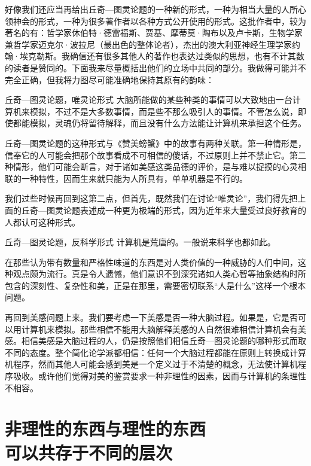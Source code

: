 好像我们还应当再给出丘奇—图灵论题的一种新的形式，一种为相当大量的人所心领神会的形式，一种为很多著作者以各种方式公开使用的形式。这批作者中，较为著名的有：哲学家休伯特·德雷福斯、贾基、摩蒂莫·陶布以及卢卡斯，生物学家兼哲学家迈克尔·波拉尼（最出色的整体论者），杰出的澳大利亚神经生理学家约翰·埃克勒斯。我确信还有很多其他人的著作也表达过类似的思想，也有不计其数的读者是赞同的。下面我来尽量概括出他们的立场中共同的部分。我做得可能并不完全正确，但我将力图尽可能准确地保持其原有的韵味：

\begin{thm}[2\ccwd]{丘奇—图灵论题，唯灵论形式}
大脑所能做的某些种类的事情可以大致地由一台计算机来模拟，不过不是大多数事情，而是些不那么吸引人的事情。不管怎么说，即使都能模拟，灵魂仍将留待解释，而且没有什么方法能让计算机来承担这个任务。
\end{thm}

丘奇—图灵论题的这种形式与《赞美螃蟹》中的故事有两种关联。第一种情形是，信奉它的人可能会把那个故事看成不可相信的傻话，不过原则上并不禁止它。第二种情形，他们可能会断言，对于诸如美感这类品德的评价，是与难以捉摸的心灵相联的一种特性，因而生来就只能为人所具有，单单机器是不行的。

我们过些时候再回到这第二点，但首先，既然我们在讨论“唯灵论”，我们得先把上面的丘奇—图灵论题表述成一种更为极端的形式，因为近年来大量受过良好教育的人都认可这种形式。

\begin{thm}[2\ccwd]{丘奇—图灵论题，反科学形式}
计算机是荒唐的。一般说来科学也都如此。
\end{thm}

在那些认为带有数量和严格性味道的东西是对人类价值的一种威胁的人们中间，这种观点颇为流行。真是令人遗憾，他们意识不到深究诸如人类心智等抽象结构时所包含的深刻性、复杂性和美，正是在那里，需要密切联系“人是什么”这样一个根本问题。

再回到美感问题上来。我们要考虑一下美感是否一种大脑过程。如果是，它是否可以用计算机来模拟。那些相信不能用大脑解释美感的人自然很难相信计算机会有美感。相信美感是大脑过程的人，仍是按照他们相信丘奇—图灵论题的哪种形式而取不同的态度。整个简化论学派都相信：任何一个大脑过程都能在原则上转换成计算机程序，然而其他人可能会感到美是一个定义过于不清楚的概念，无法使计算机程序吸收。或许他们觉得对美的鉴赏要求一种非理性的因素，因而与计算机的条理性不相容。

\section{非理性的东西与理性的东西\\可以共存于不同的层次}

